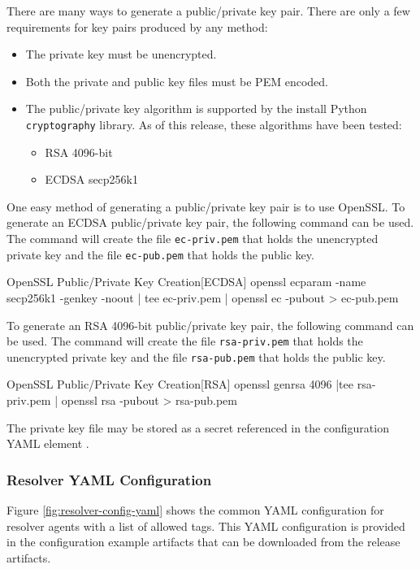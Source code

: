 There are many ways to generate a public/private key pair.  There are only a few requirements
for key pairs produced by any method:

\begin{itemize}
  \item The private key must be unencrypted.
  \item Both the private and public key files must be PEM encoded.
  \item The public/private key algorithm is supported by the install Python \texttt{cryptography} library.
    As of this release, these algorithms have been tested:
  \begin{itemize}
      \item RSA 4096-bit
      \item ECDSA secp256k1
  \end{itemize}
\end{itemize}

One easy method of generating a public/private key pair is to use OpenSSL.  To generate an ECDSA public/private key pair,
the following command can be used.  The command will create the file \texttt{ec-priv.pem} that holds the unencrypted private key
and the file \texttt{ec-pub.pem} that holds the public key.

\begin{code}{OpenSSL Public/Private Key Creation}{[ECDSA]}{}
openssl ecparam -name secp256k1 -genkey -noout | tee ec-priv.pem | openssl ec -pubout > ec-pub.pem  
\end{code}

To generate an RSA 4096-bit public/private key pair,
the following command can be used.  The command will create the file \texttt{rsa-priv.pem} that holds the unencrypted private key
and the file \texttt{rsa-pub.pem} that holds the public key.

\begin{code}{OpenSSL Public/Private Key Creation}{[RSA]}{}
openssl genrsa 4096 |tee rsa-priv.pem | openssl rsa -pubout > rsa-pub.pem
\end{code}

The private key file may be stored as a secret referenced in the configuration YAML element .

\subsubsection{Resolver YAML Configuration}\label{sec:resolver-yaml-config}
Figure \ref{fig:resolver-config-yaml} shows the common YAML configuration for resolver agents with a list of allowed tags.
This YAML configuration is provided in the configuration example artifacts that can be downloaded from the \cxoneflow release
artifacts.

